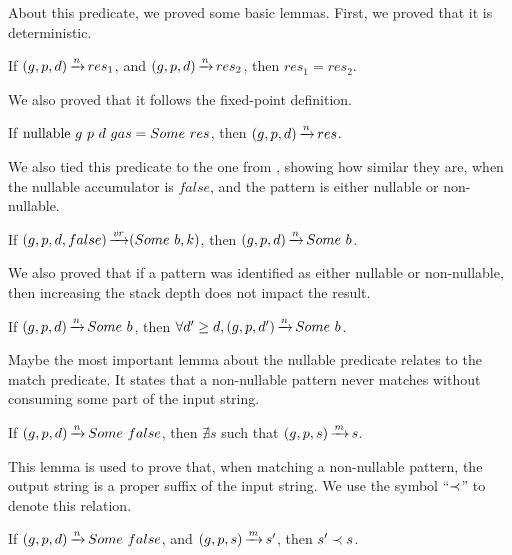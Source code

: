 About this predicate, we proved some basic lemmas.
First, we proved that it is deterministic.

\begin{lemma}
    If $(g,p,d) \operatorname{\xrightarrow{\mathit{n}}} res_1$,
    and $(g,p,d) \operatorname{\xrightarrow{\mathit{n}}} res_2$,
    then $res_1 = res_2$.
\end{lemma}

We also proved that it follows
the fixed-point definition.

\begin{lemma}
    If $\text{nullable}\ g\ p\ d\ gas = Some\ res$,
    then $(g,p,d) \operatorname{\xrightarrow{\mathit{n}}} res$.
\end{lemma}

We also tied this predicate to the
one from ,
showing how similar they are,
when the nullable accumulator is $false$,
and the pattern is either nullable or non-nullable.

\begin{lemma}%
    If $(g,p,d,false) \operatorname{\xrightarrow{\mathit{vr}}} (Some\ b,k)$,
    then $(g,p,d) \operatorname{\xrightarrow{\mathit{n}}} Some\ b$.
\end{lemma}

We also proved that if a pattern
was identified as either nullable or non-nullable,
then increasing the stack depth does not impact the result.

\begin{lemma}%
    If $(g,p,d) \operatorname{\xrightarrow{\mathit{n}}} Some\ b$,
    then $\forall d' \ge d, (g,p,d') \operatorname{\xrightarrow{\mathit{n}}} Some\ b$.
\end{lemma}

Maybe the most important lemma
about the nullable predicate
relates to the match predicate.
It states that a non-nullable pattern
never matches without consuming
some part of the input string.

\begin{lemma}%
    If $(g,p,d) \operatorname{\xrightarrow{\mathit{n}}} Some\ false$,
    then $\nexists s$ such that $(g,p,s) \operatorname{\xrightarrow{\mathit{m}}} s$.
\end{lemma}

This lemma is used to prove that,
when matching a non-nullable pattern,
the output string is a proper suffix of the input string.
We use the symbol ``$\prec$''
to denote this relation.

\begin{lemma}%
    \label{lemma:non-nullable-pattern-proper-suffix}
    If $(g,p,d) \operatorname{\xrightarrow{\mathit{n}}} Some\ false$,
    and $(g,p,s) \operatorname{\xrightarrow{\mathit{m}}} s'$,
    then $s' \prec s$.
\end{lemma}

